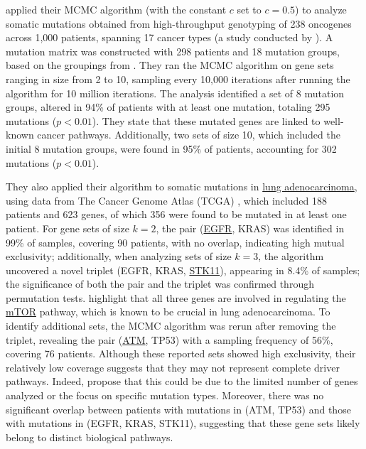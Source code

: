 \textcite{dendrix} applied their MCMC algorithm (with the constant $c$ set to $c = 0.5$) to analyze somatic mutations obtained from high-throughput genotyping of 238 oncogenes across 1,000 patients, spanning 17 cancer types (a study conducted by \textcite{thomas}). A mutation matrix was constructed with 298 patients and 18 mutation groups, based on the groupings from \textcite{thomas}. They ran the MCMC algorithm on gene sets ranging in size from 2 to 10, sampling every 10,000 iterations after running the algorithm for 10 million iterations. The analysis identified a set of 8 mutation groups, altered in 94\% of patients with at least one mutation, totaling 295 mutations ($p < 0.01$). They state that these mutated genes are linked to well-known cancer pathways. Additionally, two sets of size 10, which included the initial 8 mutation groups, were found in 95\% of patients, accounting for 302 mutations ($p < 0.01$).

They also applied their algorithm to somatic mutations in \href{https://en.wikipedia.org/wiki/Adenocarcinoma_of_the_lung}{lung adenocarcinoma}, using data from The Cancer Genome Atlas (TCGA) \cite{tcga}, which included 188 patients and 623 genes, of which 356 were found to be mutated in at least one patient. For gene sets of size $k = 2$, the pair (\href{https://www.ncbi.nlm.nih.gov/gene/1956}{EGFR}, KRAS) was identified in 99\% of samples, covering 90 patients, with no overlap, indicating high mutual exclusivity; additionally, when analyzing sets of size $k = 3$, the algorithm uncovered a novel triplet (EGFR, KRAS, \href{https://www.ncbi.nlm.nih.gov/gene/6794}{STK11}), appearing in 8.4\% of samples; the significance of both the pair and the triplet was confirmed through permutation tests. \textcite{dendrix} highlight that all three genes are involved in regulating the \href{https://www.ncbi.nlm.nih.gov/gene/2475}{mTOR} pathway, which is known to be crucial in lung adenocarcinoma. To identify additional sets, the MCMC algorithm was rerun after removing the triplet, revealing the pair (\href{https://www.ncbi.nlm.nih.gov/gene/472}{ATM}, TP53) with a sampling frequency of 56\%, covering 76 patients. Although these reported sets showed high exclusivity, their relatively low coverage suggests that they may not represent complete driver pathways. Indeed, \textcite{dendrix} propose that this could be due to the limited number of genes analyzed or the focus on specific mutation types. Moreover, there was no significant overlap between patients with mutations in (ATM, TP53) and those with mutations in (EGFR, KRAS, STK11), suggesting that these gene sets likely belong to distinct biological pathways.

